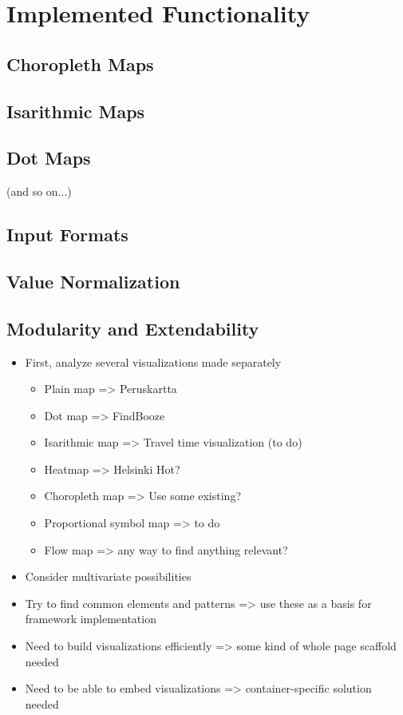 \section{Implemented Functionality}

\subsection{Choropleth Maps}

\subsection{Isarithmic Maps}

\subsection{Dot Maps}

(and so on...)

\subsection{Input Formats}

\subsection{Value Normalization}

\subsection{Modularity and Extendability}


\begin{itemize}
	\item First, analyze several visualizations made separately
	\begin{itemize}
		\item Plain map => Peruskartta
		\item Dot map => FindBooze
		\item Isarithmic map => Travel time visualization (to do)
		\item Heatmap => Helsinki Hot?
		\item Choropleth map => Use some existing?
		\item Proportional symbol map => to do
		\item Flow map => any way to find anything relevant?
	\end{itemize}
	\item Consider multivariate possibilities
	\item Try to find common elements and patterns => use these as a basis for framework implementation
	\item Need to build visualizations efficiently => some kind of whole page scaffold needed
	\item Need to be able to embed visualizations => container-specific solution needed
\end{itemize}
